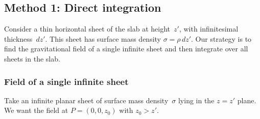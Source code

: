 \documentclass[11pt, letterpaper]{article}
\begin{document}
\subsection{Method 1: Direct integration}

Consider a thin horizontal sheet of the slab at height~$z'$, with infinitesimal thickness~$dz'$. This sheet has surface mass density $\sigma = \rho \, dz'$. Our strategy is to find the gravitational field of a single infinite sheet and then integrate over all sheets in the slab.

\subsubsection{Field of a single infinite sheet}

Take an infinite planar sheet of surface mass density~$\sigma$ lying in the $z = z'$ plane. We want the field at $P = (0, 0, z_0)$ with $z_0 > z'$.

\end{document}
